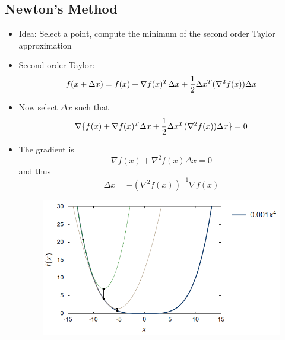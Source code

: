\subsection*{Newton's Method}
\begin{itemize}
    \item
        Idea: Select a point, compute the minimum of the second order Taylor approximation
    \item
        Second order Taylor:
        $$f(x + \Delta x) = f(x) + \nabla f(x)^T \Delta x + \frac{\displaystyle 1}{\displaystyle 2} \Delta x^T (\nabla^2 f(x)) \Delta x$$
    \item
        Now select $\Delta x$ such that 
        $$\nabla \{f(x) + \nabla f(x)^T \Delta x + \frac{\displaystyle 1}{\displaystyle 2} \Delta x^T (\nabla^2 f(x)) \Delta x\} = 0$$
    \item
        The gradient is
        $$\nabla f(x) + \nabla^2 f(x) \Delta x = 0$$
        and thus
        $$\Delta x = -(\nabla^2 f(x))^{-1} \nabla f(x)$$
        \begin{figure}[H]
            \centering
            \includegraphics[scale=0.8]{figures/newton}
        \end{figure}

\end{itemize}

